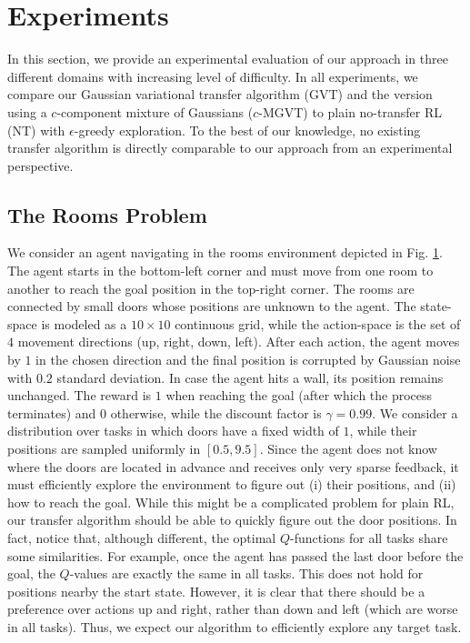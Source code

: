 \documentclass{article}
\begin{document}
\section{Experiments}

In this section, we provide an experimental evaluation of our approach in three different domains with increasing level of difficulty. In all experiments, we compare our Gaussian variational transfer algorithm (GVT) and the version using a $c$-component mixture of Gaussians ($c$-MGVT) to plain no-transfer RL (NT) with $\epsilon$-greedy exploration. To the best of our knowledge, no existing transfer algorithm is directly comparable to our approach from an experimental perspective. 

\subsection{The Rooms Problem} \label{sec:gw}

We consider an agent navigating in the rooms environment depicted in Fig. \ref{}. The agent starts in the bottom-left corner and must move from one room to another to reach the goal position in the top-right corner. The rooms are connected by small doors whose positions are unknown to the agent. The state-space is modeled as a $10 \times 10$ continuous grid, while the action-space is the set of $4$ movement directions (up, right, down, left). After each action, the agent moves by $1$ in the chosen direction and the final position is corrupted by Gaussian noise with $0.2$ standard deviation. In case the agent hits a wall, its position remains unchanged. The reward is $1$ when reaching the goal (after which the process terminates) and $0$ otherwise, while the discount factor is $\gamma = 0.99$. We consider a distribution over tasks in which doors have a fixed width of $1$, while their positions are sampled uniformly in $[0.5,9.5]$. Since the agent does not know where the doors are located in advance and receives only very sparse feedback, it must efficiently explore the environment to figure out (i) their positions, and (ii) how to reach the goal. While this might be a complicated problem for plain RL, our transfer algorithm should be able to quickly figure out the door positions. In fact, notice that, although different, the optimal $Q$-functions for all tasks share some similarities. For example, once the agent has passed the last door before the goal, the $Q$-values are exactly the same in all tasks. This does not hold for positions nearby the start state. However, it is clear that there should be a preference over actions up and right, rather than down and left (which are worse in all tasks). Thus, we expect our algorithm to efficiently explore any target task.
\end{document}

